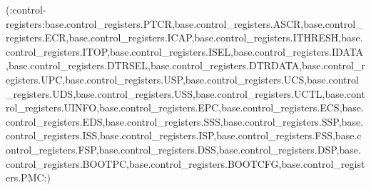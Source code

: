 (:control-registers:base.control_registers.PTCR,base.control_registers.ASCR,base.control_registers.ECR,base.control_registers.ICAP,base.control_registers.ITHRESH,base.control_registers.ITOP,base.control_registers.ISEL,base.control_registers.IDATA,base.control_registers.DTRSEL,base.control_registers.DTRDATA,base.control_registers.UPC,base.control_registers.USP,base.control_registers.UCS,base.control_registers.UDS,base.control_registers.USS,base.control_registers.UCTL,base.control_registers.UINFO,base.control_registers.EPC,base.control_registers.ECS,base.control_registers.EDS,base.control_registers.SSS,base.control_registers.SSP,base.control_registers.ISS,base.control_registers.ISP,base.control_registers.FSS,base.control_registers.FSP,base.control_registers.DSS,base.control_registers.DSP,base.control_registers.BOOTPC,base.control_registers.BOOTCFG,base.control_registers.PMC:)
